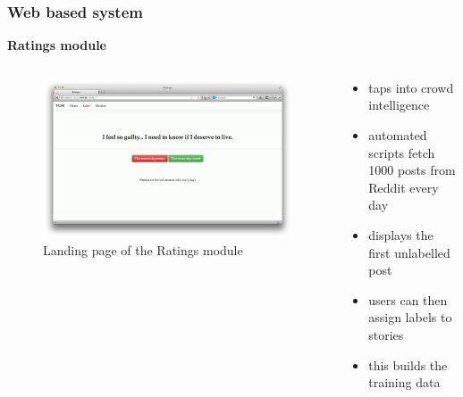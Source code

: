 \documentclass{beamer}
\begin{document}
    \begin{frame}
        \frametitle{Web based system}
        \begin{center}
            \textbf{Ratings module}
        \end{center}
        \begin{columns}
            \begin{column}{0.5\textwidth}
                \begin{figure}
                    \centering
                    \includegraphics[width=\textwidth]{figures/ratings.png}
                    \caption{Landing page of the Ratings module}
                \end{figure}
            \end{column}
            \begin{column}{0.5\textwidth}
                \begin{itemize}
                    \item{taps into crowd intelligence}
                    \item{automated scripts fetch 1000 posts from Reddit every day}
                    \item{displays the first unlabelled post}
                    \item{users can then assign labels to stories}
                    \item{this builds the training data}
                \end{itemize}
            \end{column}
        \end{columns}
    \end{frame}
    
\end{document}
